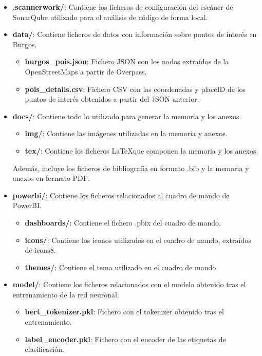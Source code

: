 \begin{itemize}
    \item \textbf{.scannerwork/}: Contiene los ficheros de configuración del escáner de SonarQube utilizado para el análisis de código de forma local.
    \item \textbf{data/}: Contiene ficheros de datos con información sobre puntos de interés en Burgos.
        \begin{itemize}
            \item \textbf{burgos\_pois.json}: Fichero JSON con los nodos extraídos de la OpenStreetMaps a partir de Overpass. 
            \item \textbf{pois\_details.csv}: Fichero CSV con las coordenadas y placeID de los puntos de interés obtenidos a partir del JSON anterior.
        \end{itemize}
    \item \textbf{docs/}: Contiene todo lo utilizado para generar la memoria y los anexos.
        \begin{itemize}
            \item \textbf{img/}: Contiene las imágenes utilizadas en la memoria y anexos.
            \item \textbf{tex/}: Contiene los ficheros \LaTeX que componen la memoria y los anexos.
        \end{itemize}
        Además, incluye los ficheros de bibliografía en formato .bib y la memoria y anexos en formato PDF.
    \item \textbf{powerbi/}: Contiene los ficheros relacionados al cuadro de mando de PowerBI.
        \begin{itemize}
            \item \textbf{dashboards/}: Contiene el fichero .pbix del cuadro de mando.
            \item \textbf{icons/}: Contiene los iconos utilizados en el cuadro de mando, extraídos de icons8.\cite{icons8}
            \item \textbf{themes/}: Contiene el tema\cite{theme} utilizado en el cuadro de mando.
        \end{itemize}
    \item \textbf{model/}: Contiene los ficheros relacionados con el modelo obtenido tras el entrenamiento de la red neuronal.
        \begin{itemize}
            \item \textbf{bert\_tokenizer.pkl}: Fichero con el tokenizer obtenido tras el entrenamiento.
            \item \textbf{label\_encoder.pkl}: Fichero con el encoder de las etiquetas de clasificación.

\end{itemize}
\end{itemize}
